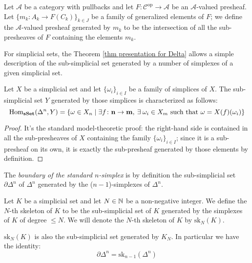 \begin{defin}
Let $\mathcal A$ be a category with pullbacks and let $F \colon \mathcal C^{\mathrm{op}} \to \mathcal A$ be an $\mathcal A$-valued presheaf. Let $\{m_k \colon A_k \to F(C_k)\}_{k \in J}$ be a family of generalized elements of $F$; we define the $\mathcal A$-valued presheaf generated by $m_k$ to be the intersection of all the sub-presheaves of $F$ containing the elements $m_k$.
\end{defin}

For simplicial sets, the Theorem \ref{thm presentation for Delta} allows a simple description of the sub-simplicial set generated by a number of simplexes of a given simplicial set.

\begin{prop} \label{prop sub simplicial set}
Let $X$ be a simplicial set and let $\{\omega_i\}_{i \in I}$ be a family of simplices of $X$. The sub-simplicial set $Y$ generated by those simplices is characterized as follows:
\[
\mathrm{Hom}_{\mathbf{sSet}}(\Delta^n,Y) = \{\omega \in X_n \mid \exists f \colon \mathbf n \to \mathbf m, \: \exists \: \omega_i \in X_m \text{ such that } \omega = X(f)(\omega_i) \}
\]
\end{prop}

\begin{proof}
It's the standard model-theoretic proof: the right-hand side is contained in all the sub-presheaves of $X$ containing the family $\{\omega_i\}_{i \in I}$; since it is a sub-presheaf on its own, it is exactly the sub-presheaf generated by those elements by definition.
\end{proof}

\begin{defin}
The \emph{boundary of the standard $n$-simplex} is by definition the sub-simplicial set $\partial \Delta^n$ of $\Delta^n$ generated by the ($n-1$)-simplexes of $\Delta^n$.
\end{defin}

\begin{defin}
Let $K$ be a simplicial set and let $N \in \mathbb{N}$ be a non-negative integer. We define the $N$-th skeleton of $K$ to be the sub-simplicial set of $K$ generated by the simplexes of $K$ of degree $\le N$. We will denote the $N$-th skeleton of $K$ by $\mathrm{sk}_N(K)$.
\end{defin}

\begin{rmk}
$\mathrm{sk}_N(K)$ is also the sub-simplicial set generated by $K_N$. In particular we have the identity:
\[
\partial \Delta^n = \mathrm{sk}_{n-1}(\Delta^n)
\]
\end{rmk}

